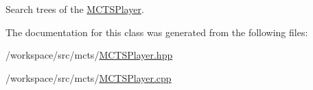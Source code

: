 Search trees of the \hyperlink{classmcts_1_1_m_c_t_s_player}{M\+C\+T\+S\+Player}. 



The documentation for this class was generated from the following files\+:\begin{DoxyCompactItemize}
\item 
/workspace/src/mcts/\hyperlink{_m_c_t_s_player_8hpp}{M\+C\+T\+S\+Player.\+hpp}\item 
/workspace/src/mcts/\hyperlink{_m_c_t_s_player_8cpp}{M\+C\+T\+S\+Player.\+cpp}\end{DoxyCompactItemize}
